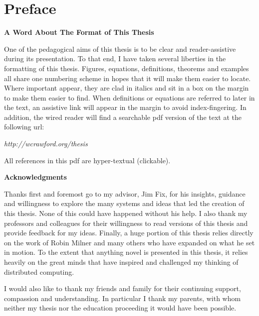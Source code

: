\chapter*{Preface}
\vspace{5cm}
\begin{center}\textbf{A Word About The Format of This Thesis}\end{center}
One of the pedagogical aims of this thesis is to be clear and reader-assistive during its presentation.  To that end, I have taken several liberties in the formatting of this thesis.  Figures, equations, definitions, theorems and examples all share one numbering scheme in hopes that it will make them easier to locate. Where important  appear, they are clad in italics and sit in a box on the margin to make them easier to find.  When definitions or equations are referred to later in the text, an assistive link will appear in the margin to avoid index-fingering.  In addition, the wired reader will find a searchable pdf version of the text at the following url:
\begin{center}
	\emph{http://wcrawford.org/thesis}
\end{center}
All references in this pdf are hyper-textual (clickable).\\


\begin{center}\textbf{Acknowledgments}\end{center}
Thanks first and foremost go to my advisor, Jim Fix, for his insights, guidance and willingness to explore the many systems and ideas that led the creation of this thesis.  None of this could have happened without his help.  I also thank my professors and colleagues for their willingness to read versions of this thesis and provide feedback for my ideas.  Finally, a huge portion of this thesis relies directly on the work of Robin Milner and many others who have expanded on what he set in motion.  To the extent that anything novel is presented in this thesis, it relies heavily on the great minds that have inspired and challenged my thinking of distributed computing.

I would also like to thank my friends and family for their continuing support, compassion and understanding.  In particular I thank my parents, with whom neither my thesis nor the education proceeding it would have been possible.
